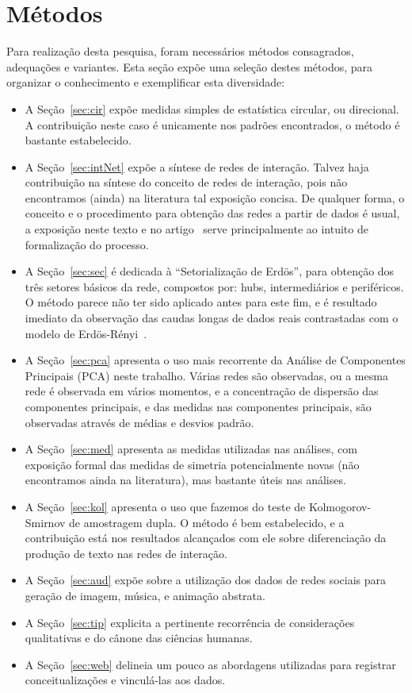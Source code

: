 \documentclass[a4paper,openright,12pt]{report} %
\begin{document}
\chapter{Métodos}
Para realização desta pesquisa, foram
necessários métodos consagrados, adequações
e variantes.
Esta seção expõe uma seleção destes métodos,
para organizar o conhecimento
e exemplificar esta diversidade:
\begin{itemize}
    \item A Seção~\ref{sec:cir} expõe medidas simples
de estatística circular, ou direcional.
A contribuição neste caso é unicamente nos
padrões encontrados, o método é bastante estabelecido.
    \item A Seção~\ref{sec:intNet} expõe a síntese de redes
        de interação. Talvez haja contribuição na síntese
        do conceito de redes de interação, pois não 
        encontramos (ainda) na literatura tal exposição
        concisa. De qualquer forma, o conceito e o procedimento
        para obtenção das redes a partir de dados é usual,
        a exposição neste texto e no artigo~\cite{timeS} serve
        principalmente ao intuito de formalização do
        processo.
    \item A Seção~\ref{sec:sec} é dedicada à ``Setorialização de Erdös'', para obtenção dos três setores básicos da rede, compostos por: hubs, intermediários e periféricos. 
        O método parece não ter sido aplicado antes para este fim, e é resultado imediato da observação das caudas longas de dados reais contrastadas com o modelo de Erdös-Rényi~\cite{3setores}.
    \item A Seção~\ref{sec:pca} apresenta o uso mais recorrente da Análise de Componentes Principais (PCA) neste trabalho. Várias redes são observadas, ou a mesma rede é observada em vários momentos, e a concentração
        de dispersão das componentes principais, e das medidas nas componentes principais, são observadas através de médias e desvios padrão.
    \item A Seção~\ref{sec:med} apresenta as medidas utilizadas nas análises, com exposição formal das medidas de simetria potencialmente novas (não encontramos ainda na literatura), mas bastante úteis nas análises.
    \item A Seção~\ref{sec:kol} apresenta o uso que fazemos do teste de Kolmogorov-Smirnov de amostragem dupla. O método é bem estabelecido, e a contribuição está nos resultados alcançados com ele sobre diferenciação
        da produção de texto nas redes de interação.
    \item A Seção~\ref{sec:aud} expõe sobre a utilização dos dados de redes sociais para geração de imagem, música, e animação abstrata.
    \item A Seção~\ref{sec:tip} explicita a pertinente recorrência de considerações qualitativas e do cânone das ciências humanas.
    \item A Seção~\ref{sec:web} delineia um pouco as abordagens
        utilizadas para registrar conceitualizações e vinculá-las
        aos dados.
\end{itemize}
\end{document}
